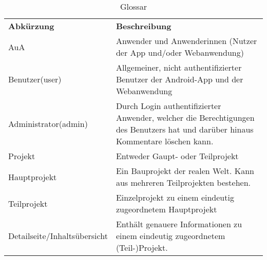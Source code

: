\begin{table}[h]
	\centering
	\begin{tabularx}{\textwidth}{X X}
		\rowcolor[HTML]{C0C0C0} 
		\textbf{Abkürzung} & \textbf{Beschreibung} \\
		AuA & Anwender und Anwenderinnen (Nutzer der App und/oder Webanwendung) \\
		\rowcolor[HTML]{E7E7E7} 
		Benutzer(user) & Allgemeiner, nicht authentifizierter Benutzer der Android-App und der Webanwendung \\
		Administrator(admin) & Durch Login authentifizierter Anwender, welcher die Berechtigungen des Benutzers hat und darüber hinaus Kommentare löschen kann. \\
		\rowcolor[HTML]{E7E7E7} 
		Projekt & Entweder Gaupt- oder Teilprojekt \\
		Hauptprojekt & Ein Bauprojekt der realen Welt. Kann aus mehreren Teilprojekten bestehen. \\
		\rowcolor[HTML]{E7E7E7} 
		Teilprojekt & Einzelprojekt zu einem eindeutig zugeordnetem Hauptprojekt\\
		Detailseite/Inhaltsübersicht & Enthält genauere Informationen zu einem eindeutig zugeordnetem (Teil-)Projekt.\\
	\end{tabularx}
	\caption{Glossar}
	\label{table:glossar}
\end{table}